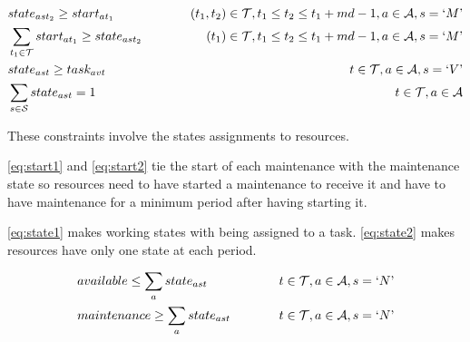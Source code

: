 \documentclass{roadef}
\newcommand{\mq}[1] {`#1\textrm'}
\begin{document}
    \begin{align}
        & state_{ast_2} \geq start_{at_1} 
                & \hspace{10mm} (t_1, t_2) \in \mathcal{T}, t_1 \leq t_2 \leq t_1 + md - 1, a \in \mathcal{A}, s = \mq{M} \label{eq:start1}\\
        & \sum_{t_1 \in \mathcal{T}} start_{at_1} \geq state_{ast_2} 
                & \hspace{10mm} (t_1) \in \mathcal{T}, t_1 \leq t_2 \leq t_1 + md - 1, a \in \mathcal{A}, s = \mq{M} \label{eq:start2}\\
        & state_{ast} \geq task_{avt} 
                & \hspace{10mm} t \in \mathcal{T}, a \in \mathcal{A}, s = \mq{V} \label{eq:state1}\\
        & \sum_{s \in \mathcal{S}} state_{ast} = 1 
                & \hspace{10mm} t \in \mathcal{T}, a \in \mathcal{A} \label{eq:state2}
    \end{align}

    These constraints involve the states assignments to resources.

    \ref{eq:start1} and \ref{eq:start2} tie the start of each maintenance with the maintenance state so resources need to have started a maintenance to receive it and have to have maintenance for a minimum period after having starting it.

    \ref{eq:state1} makes working states with being assigned to a task. \ref{eq:state2} makes resources have only one state at each period.

    \begin{align}
        & available \leq \sum_{a} state_{ast}
                & \hspace{10mm} t \in \mathcal{T}, a \in \mathcal{A}, s = \mq{N} \label{eq:available}\\
        & maintenance \geq \sum_{a} state_{ast}
                & \hspace{10mm} t \in \mathcal{T}, a \in \mathcal{A}, s = \mq{N} \label{eq:maintenance}
    \end{align}
\end{document}
